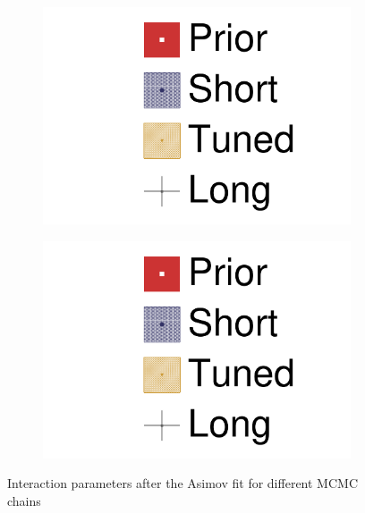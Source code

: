 \begin{figure}[h]
	\begin{subfigure}[t]{0.49\textwidth}
		\includegraphics[width=\textwidth, trim={0mm 0mm 0mm 0mm}, clip,page=20]{figures/mach3/Asimov/2017_NewDet_Asimov_actually_0_2017b_NewDet_3Xsec_4Det_5Flux_NewXSecTune_Asimov_0_2017b_NewDet_NewData_Asimov_Long_0}
	\end{subfigure}
	\begin{subfigure}[t]{0.49\textwidth}
		\includegraphics[width=\textwidth, trim={0mm 0mm 0mm 0mm}, clip,page=21]{figures/mach3/Asimov/2017_NewDet_Asimov_actually_0_2017b_NewDet_3Xsec_4Det_5Flux_NewXSecTune_Asimov_0_2017b_NewDet_NewData_Asimov_Long_0}
	\end{subfigure}
	\caption{Interaction parameters after the Asimov fit for different MCMC chains}
	\label{fig:xsec_asimov}
\end{figure}

